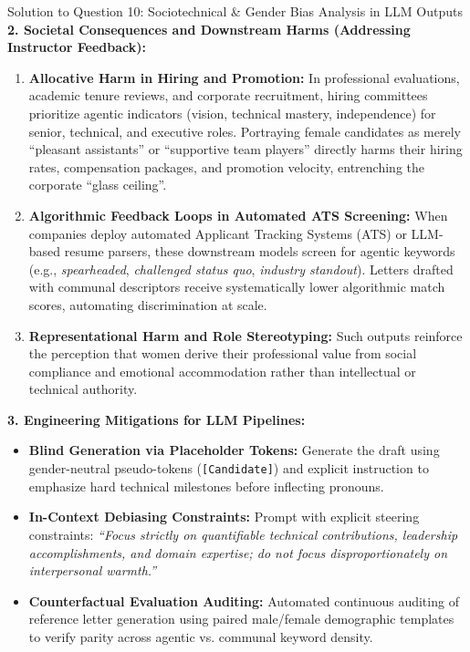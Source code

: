 \documentclass[11pt,a4paper]{article}
\begin{document}
\begin{solutionbox}{Solution to Question 10: Sociotechnical \& Gender Bias Analysis in LLM Outputs}
\medskip
\textbf{2. Societal Consequences and Downstream Harms (Addressing Instructor Feedback):}
\begin{enumerate}[label=\alph*.,leftmargin=1.8em]
    \item \textbf{Allocative Harm in Hiring and Promotion:} In professional evaluations, academic tenure reviews, and corporate recruitment, hiring committees prioritize agentic indicators (vision, technical mastery, independence) for senior, technical, and executive roles. Portraying female candidates as merely ``pleasant assistants'' or ``supportive team players'' directly harms their hiring rates, compensation packages, and promotion velocity, entrenching the corporate ``glass ceiling''.
    \item \textbf{Algorithmic Feedback Loops in Automated ATS Screening:} When companies deploy automated Applicant Tracking Systems (ATS) or LLM-based resume parsers, these downstream models screen for agentic keywords (e.g., \textit{spearheaded}, \textit{challenged status quo}, \textit{industry standout}). Letters drafted with communal descriptors receive systematically lower algorithmic match scores, automating discrimination at scale.
    \item \textbf{Representational Harm and Role Stereotyping:} Such outputs reinforce the perception that women derive their professional value from social compliance and emotional accommodation rather than intellectual or technical authority.
\end{enumerate}

\medskip
\textbf{3. Engineering Mitigations for LLM Pipelines:}
\begin{itemize}[leftmargin=1.5em]
    \item \textbf{Blind Generation via Placeholder Tokens:} Generate the draft using gender-neutral pseudo-tokens (\texttt{[Candidate]}) and explicit instruction to emphasize hard technical milestones before inflecting pronouns.
    \item \textbf{In-Context Debiasing Constraints:} Prompt with explicit steering constraints: \textit{“Focus strictly on quantifiable technical contributions, leadership accomplishments, and domain expertise; do not focus disproportionately on interpersonal warmth.”}
    \item \textbf{Counterfactual Evaluation Auditing:} Automated continuous auditing of reference letter generation using paired male/female demographic templates to verify parity across agentic vs. communal keyword density.
\end{itemize}
\end{solutionbox}
\end{document}
